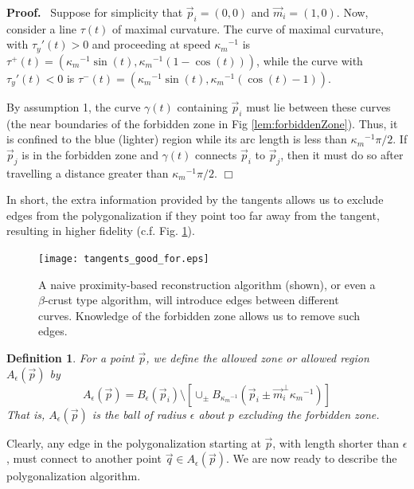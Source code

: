 \documentclass{article}
\newtheorem{definition}[cntr]{Definition}
\newenvironment{proof}{
  \noindent\textbf{Proof.}\ }{\hspace*{\fill}
  \begin{math}\Box\end{math}\medskip}
\numberwithin{cntr}{section}
\numberwithin{equation}{section}
\newcommand{\vp}[0]{{\vec{p}}}
\newcommand{\vq}[0]{{\vec{q}}}
\newcommand{\vm}[0]{{\vec{m}}}
\newcommand{\ball}[2]{ { B_{#1}(#2) } }
\newcommand{\allowed}[2]{ { A_{#1}(#2) } }
\newcommand{\curvemax}{{\kappa_{m}}}
\newcommand{\curvemaxi}{{\curvemax^{-1}}}
\begin{document}
\begin{proof}
Suppose for simplicity that $\vp_{i}=(0,0)$ and $\vm_{i}=(1,0)$. Now, consider a line $\tau(t)$ of maximal curvature. The curve of maximal curvature, with $\tau_{y}'(t) > 0$ and proceeding at speed $\curvemaxi$ is $\tau^{+}(t)=(\curvemaxi \sin(t), \curvemaxi (1-\cos(t)))$, while the curve with $\tau_{y}'(t) < 0$ is $\tau^{-}(t)=(\curvemaxi \sin(t), \curvemaxi (\cos(t)-1))$.

By assumption 1, the curve $\gamma(t)$ containing $\vp_i$
must lie between these curves (the near boundaries of the forbidden zone
in Fig \ref{lem:forbiddenZone}). Thus, it is confined to the blue (lighter)
region while its arc length is less than $\curvemaxi \pi/2$.
If $\vp_{j}$ is in the forbidden zone and
$\gamma(t)$ connects $\vp_{i}$ to $\vp_{j}$, then it must do so after travelling a distance greater than $\curvemaxi \pi/2$.
\end{proof}

In short, the extra information provided by the tangents
allows us to exclude edges from the polygonalization if they point too far away
from the tangent, resulting in higher fidelity (c.f. Fig. \ref{fig:proximityVsTangentBased}).

\begin{figure}
\setlength{\unitlength}{0.240900pt}
\ifx\plotpoint\undefined\newsavebox{\plotpoint}\fi
\sbox{\plotpoint}{\rule[-0.200pt]{0.400pt}{0.400pt}}%
\texttt{[image: tangents\_good\_for.eps]}

\caption{A naive proximity-based reconstruction algorithm (shown),
or even a $\beta$-crust type algorithm, will introduce edges
between different curves. Knowledge of the forbidden zone allows us to
remove such edges.}
\label{fig:proximityVsTangentBased}
\end{figure}

\begin{definition}
  \label{def:AllowedRegion}
For a point $\vp$, we define the \emph{allowed zone} or
\emph{allowed region} $\allowed{\epsilon}{\vp}$ by
  \begin{equation}
    \label{eq:allowedRegion}
    \allowed{\epsilon}{\vp}=\ball{\epsilon}{\vp_{i}} \setminus \left[ \cup_{\pm} \ball{\curvemaxi}{\vp_{i} \pm \vm_{i}^{\perp} \curvemaxi} \right]
  \end{equation}
  That is, $\allowed{\epsilon}{\vp}$ is the ball of radius $\epsilon$ about $p$ excluding the forbidden zone.
\end{definition}

Clearly, any edge in the polygonalization starting at $\vp$, with length shorter than $\epsilon$, must connect to another point $\vq \in \allowed{\epsilon}{\vp}$.  We are now ready to describe the polygonalization algorithm.
\end{document}
